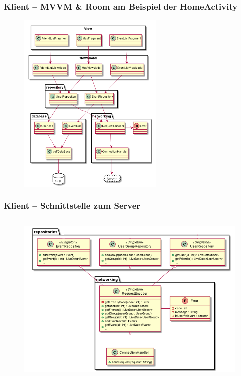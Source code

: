 \documentclass[aspectratio=1610]{beamer}
\begin{document}
	\begin{frame}[plain]
        \frametitle{\textbf{Klient} -- MVVM \& Room am Beispiel der HomeActivity}
        \begin{figure}[!htb]
            \centering
            \includegraphics[height = 250pt]{images/database.png}
        \end{figure}
	\end{frame}

    \begin{frame}[plain]
      \frametitle{\textbf{Klient} -- Schnittstelle zum Server}
      \begin{figure}[!htb]
        \centering
        \includegraphics[height = 240pt]{images/connection_client.png}
        \end{figure}
    \end{frame}
    
\end{document}
